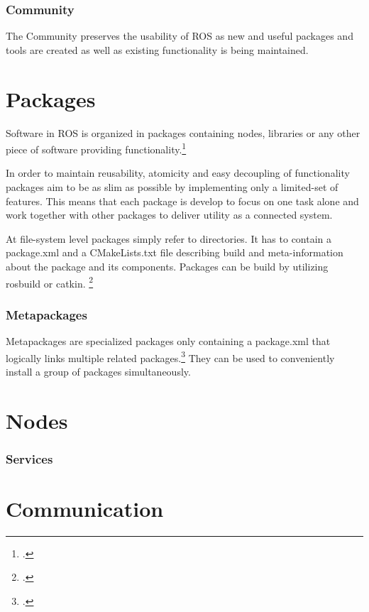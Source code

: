 \subsubsection{Community}
The Community preserves the usability of ROS as new and useful packages and tools are created as well as existing functionality is being maintained.


\section{Packages}
Software in ROS is organized in packages containing nodes, libraries or any other piece of software providing functionality.\footcite{openSourceRoboticsFoundationPackageNodate} 

In order to maintain reusability, atomicity and easy decoupling of functionality packages aim to be as slim as possible by implementing only a limited-set of features. This means that each package is develop to focus on one task alone and work together with other packages to deliver utility as a connected system.

At file-system level packages simply refer to directories. It has to contain a package.xml and a CMakeLists.txt file describing build and meta-information about the package and its components.
Packages can be build by utilizing rosbuild or catkin. \footcite{openSourceRoboticsFoundationBuildNodate}

\subsubsection{Metapackages} 
Metapackages are specialized packages only containing a package.xml that logically links multiple related packages.\footcite{openSourceRoboticsFoundationMetapackageNodate}
They can be used to conveniently install a group of packages simultaneously. %



\section{Nodes}

\subsubsection{Services}



\section{Communication}

